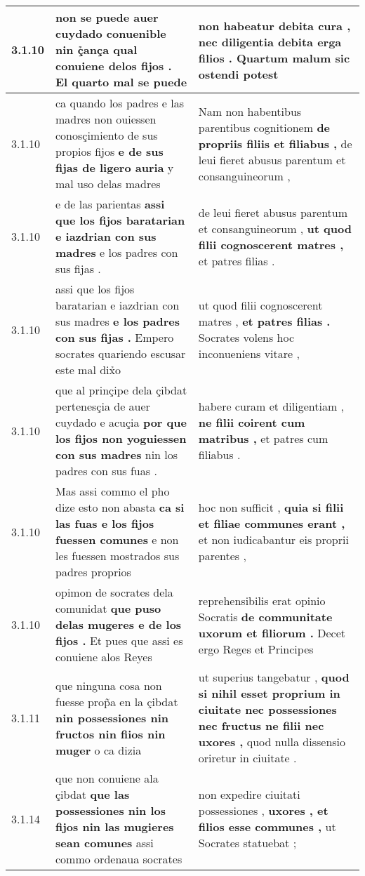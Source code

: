 \begin{tabular}{|p{1cm}|p{6.5cm}|p{6.5cm}|}
3.1.10 & non se puede auer cuydado conuenible \textbf{ nin ç̉ança qual conuiene delos fijos . } El quarto mal se puede & non habeatur debita cura , \textbf{ nec diligentia debita erga filios . } Quartum malum sic ostendi potest \\\hline
3.1.10 & ca quando los padres e las madres non ouiessen conosçimiento de sus propios fijos \textbf{ e de sus fijas de ligero auria } y mal uso delas madres & Nam non habentibus parentibus cognitionem \textbf{ de propriis filiis et filiabus , } de leui fieret abusus parentum et consanguineorum , \\\hline
3.1.10 & e de las parientas \textbf{ assi que los fijos baratarian e iazdrian con sus madres } e los padres con sus fijas . & de leui fieret abusus parentum et consanguineorum , \textbf{ ut quod filii cognoscerent matres , } et patres filias . \\\hline
3.1.10 & assi que los fijos baratarian e iazdrian con sus madres \textbf{ e los padres con sus fijas . } Empero socrates quariendo escusar este mal dix̉o & ut quod filii cognoscerent matres , \textbf{ et patres filias . } Socrates volens hoc inconueniens vitare , \\\hline
3.1.10 & que al prinçipe dela çibdat pertenesçia de auer cuydado e acuçia \textbf{ por que los fijos non yoguiessen con sus madres } nin los padres con sus fuas . & habere curam et diligentiam , \textbf{ ne filii coirent cum matribus , } et patres cum filiabus . \\\hline
3.1.10 & Mas assi commo el pho dize esto non abasta \textbf{ ca si las fuas e los fijos fuessen comunes } e non les fuessen mostrados sus padres proprios & hoc non sufficit , \textbf{ quia si filii et filiae communes erant , } et non iudicabantur eis proprii parentes , \\\hline
3.1.10 & opimon de socrates dela comunidat \textbf{ que puso delas mugeres e de los fijos . } Et pues que assi es conuiene alos Reyes & reprehensibilis erat opinio Socratis \textbf{ de communitate uxorum et filiorum . } Decet ergo Reges et Principes \\\hline
3.1.11 & que ninguna cosa non fuesse prop̃a en la çibdat \textbf{ nin possessiones nin fructos nin fiios nin muger } o ca dizia & ut superius tangebatur , \textbf{ quod si nihil esset proprium in ciuitate nec possessiones nec fructus ne filii nec uxores , } quod nulla dissensio oriretur in ciuitate . \\\hline
3.1.14 & que non conuiene ala çibdat \textbf{ que las possessiones nin los fijos nin las mugieres sean comunes } assi commo ordenaua socrates & non expedire ciuitati possessiones , \textbf{ uxores , et filios esse communes , } ut Socrates statuebat ; \\\hline

\end{tabular}
